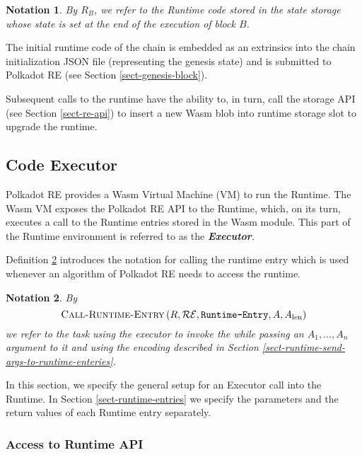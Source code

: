\documentclass{book}
\newcommand{\tmem}[1]{{\em #1\/}}
\newcommand{\tmname}[1]{\textsc{#1}}
\newcommand{\tmop}[1]{\ensuremath{\operatorname{#1}}}
\newcommand{\tmstrong}[1]{\textbf{#1}}
\newcommand{\tmtextbf}[1]{{\bfseries{#1}}}
\newcommand{\tmtextit}[1]{{\itshape{#1}}}
\newcommand{\tmtextsc}[1]{{\scshape{#1}}}
\newcommand{\tmtexttt}[1]{{\ttfamily{#1}}}
\newcommand{\tmverbatim}[1]{{\ttfamily{#1}}}
\newtheorem{notation}{Notation}
\providecommand{\tmem}[1]{\tmtextit{#1}}
\providecommand{\tmname}[1]{\tmtextsc{#1}}
\providecommand{\tmop}[1]{\ensuremath{\mathrm{#1}}}
\providecommand{\tmstrong}[1]{\tmtextbf{#1}}
\providecommand{\tmtextbf}[1]{\tmtextbf{#1}}
\providecommand{\tmtextit}[1]{\tmtextit{#1}}
\providecommand{\tmverbatim}[1]{\tmtexttt{#1}}
\newtheorem{notation}{Notation}
\begin{document}
\begin{notation}
  \label{nota-runtime-code-at-state}By $R_B$, we refer to the Runtime code
  stored in the state storage whose state is set at the end of the execution
  of block $B$.
\end{notation}

The initial runtime code of the chain is embedded as an extrinsics into the
chain initialization JSON file (representing the genesis state) and is
submitted to Polkadot RE (see Section \ref{sect-genesis-block}).

Subsequent calls to the runtime have the ability to, in turn, call the storage
API (see Section \ref{sect-re-api}) to insert a new Wasm blob into runtime
storage slot to upgrade the runtime.

\subsection{Code Executor}

Polkadot RE provides a Wasm Virtual Machine (VM) to run the Runtime. The Wasm
VM exposes the Polkadot RE API to the Runtime, which, on its turn, executes a
call to the Runtime entries stored in the Wasm module. This part of the
Runtime environment is referred to as the {\tmem{{\tmstrong{Executor}}.}}

Definition \ref{nota-call-into-runtime} introduces the notation for calling
the runtime entry which is used whenever an algorithm of Polkadot RE needs to
access the runtime.

\begin{notation}
  \label{nota-call-into-runtime} By
  \[ \text{{\tmname{Call-Runtime-Entry}}} \left( R, \mathcal{R}\mathcal{E},
     \text{\tmverbatim{Runtime-Entry}}, A, A_{\tmop{len}} \right) \]
  we refer to the task using the executor to invoke the
  \tmverbatim{Runtime-Entry} while passing an $A_1, \ldots, A_n$ argument to
  it and using the encoding described in Section
  \ref{sect-runtime-send-args-to-runtime-enteries}.
\end{notation}

In this section, we specify the general setup for an Executor call into the
Runtime. In Section \ref{sect-runtime-entries} we specify the parameters and
the return values of each Runtime entry separately.

\subsubsection{Access to Runtime API}
\end{document}
